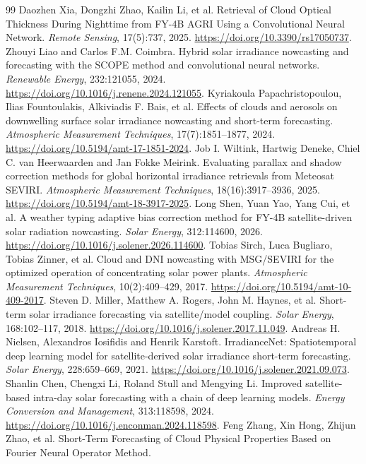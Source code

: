 \documentclass[11pt]{article}
\begin{document}
\begin{thebibliography}{99}
Daozhen Xia, Dongzhi Zhao, Kailin Li, et al.
Retrieval of Cloud Optical Thickness During Nighttime from FY-4B AGRI Using a Convolutional Neural Network.
\textit{Remote Sensing}, 17(5):737, 2025.
\url{https://doi.org/10.3390/rs17050737}.
Zhouyi Liao and Carlos F.M. Coimbra.
Hybrid solar irradiance nowcasting and forecasting with the SCOPE method and convolutional neural networks.
\textit{Renewable Energy}, 232:121055, 2024.
\url{https://doi.org/10.1016/j.renene.2024.121055}.
Kyriakoula Papachristopoulou, Ilias Fountoulakis, Alkiviadis F. Bais, et al.
Effects of clouds and aerosols on downwelling surface solar irradiance nowcasting and short-term forecasting.
\textit{Atmospheric Measurement Techniques}, 17(7):1851--1877, 2024.
\url{https://doi.org/10.5194/amt-17-1851-2024}.
Job I. Wiltink, Hartwig Deneke, Chiel C. van Heerwaarden and Jan Fokke Meirink.
Evaluating parallax and shadow correction methods for global horizontal irradiance retrievals from Meteosat SEVIRI.
\textit{Atmospheric Measurement Techniques}, 18(16):3917--3936, 2025.
\url{https://doi.org/10.5194/amt-18-3917-2025}.
Long Shen, Yuan Yao, Yang Cui, et al.
A weather typing adaptive bias correction method for FY-4B satellite-driven solar radiation nowcasting.
\textit{Solar Energy}, 312:114600, 2026.
\url{https://doi.org/10.1016/j.solener.2026.114600}.
Tobias Sirch, Luca Bugliaro, Tobias Zinner, et al.
Cloud and DNI nowcasting with MSG/SEVIRI for the optimized operation of concentrating solar power plants.
\textit{Atmospheric Measurement Techniques}, 10(2):409--429, 2017.
\url{https://doi.org/10.5194/amt-10-409-2017}.
Steven D. Miller, Matthew A. Rogers, John M. Haynes, et al.
Short-term solar irradiance forecasting via satellite/model coupling.
\textit{Solar Energy}, 168:102--117, 2018.
\url{https://doi.org/10.1016/j.solener.2017.11.049}.
Andreas H. Nielsen, Alexandros Iosifidis and Henrik Karstoft.
IrradianceNet: Spatiotemporal deep learning model for satellite-derived solar irradiance short-term forecasting.
\textit{Solar Energy}, 228:659--669, 2021.
\url{https://doi.org/10.1016/j.solener.2021.09.073}.
Shanlin Chen, Chengxi Li, Roland Stull and Mengying Li.
Improved satellite-based intra-day solar forecasting with a chain of deep learning models.
\textit{Energy Conversion and Management}, 313:118598, 2024.
\url{https://doi.org/10.1016/j.enconman.2024.118598}.
Feng Zhang, Xin Hong, Zhijun Zhao, et al.
Short-Term Forecasting of Cloud Physical Properties Based on Fourier Neural Operator Method.

\end{thebibliography}
\end{document}
